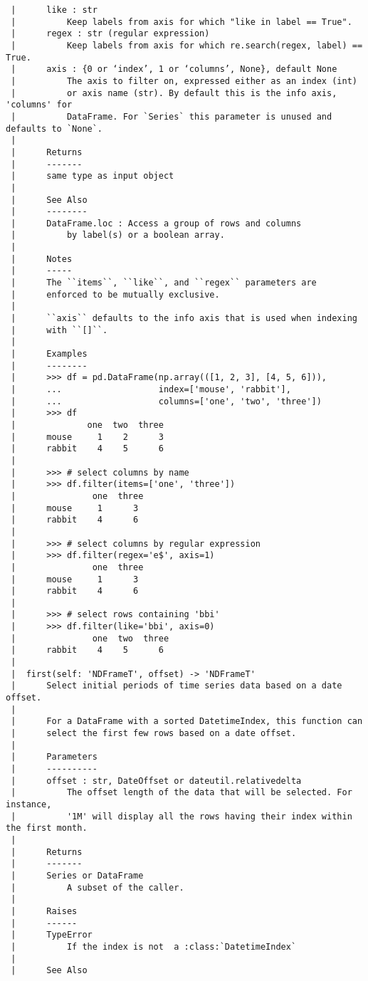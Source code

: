 \documentclass[
  letterpaper,
  DIV=11,
  numbers=noendperiod]{scrreprt}
\begin{document}
\begin{verbatim}
 |      like : str
 |          Keep labels from axis for which "like in label == True".
 |      regex : str (regular expression)
 |          Keep labels from axis for which re.search(regex, label) == True.
 |      axis : {0 or ‘index’, 1 or ‘columns’, None}, default None
 |          The axis to filter on, expressed either as an index (int)
 |          or axis name (str). By default this is the info axis, 'columns' for
 |          DataFrame. For `Series` this parameter is unused and defaults to `None`.
 |      
 |      Returns
 |      -------
 |      same type as input object
 |      
 |      See Also
 |      --------
 |      DataFrame.loc : Access a group of rows and columns
 |          by label(s) or a boolean array.
 |      
 |      Notes
 |      -----
 |      The ``items``, ``like``, and ``regex`` parameters are
 |      enforced to be mutually exclusive.
 |      
 |      ``axis`` defaults to the info axis that is used when indexing
 |      with ``[]``.
 |      
 |      Examples
 |      --------
 |      >>> df = pd.DataFrame(np.array(([1, 2, 3], [4, 5, 6])),
 |      ...                   index=['mouse', 'rabbit'],
 |      ...                   columns=['one', 'two', 'three'])
 |      >>> df
 |              one  two  three
 |      mouse     1    2      3
 |      rabbit    4    5      6
 |      
 |      >>> # select columns by name
 |      >>> df.filter(items=['one', 'three'])
 |               one  three
 |      mouse     1      3
 |      rabbit    4      6
 |      
 |      >>> # select columns by regular expression
 |      >>> df.filter(regex='e$', axis=1)
 |               one  three
 |      mouse     1      3
 |      rabbit    4      6
 |      
 |      >>> # select rows containing 'bbi'
 |      >>> df.filter(like='bbi', axis=0)
 |               one  two  three
 |      rabbit    4    5      6
 |  
 |  first(self: 'NDFrameT', offset) -> 'NDFrameT'
 |      Select initial periods of time series data based on a date offset.
 |      
 |      For a DataFrame with a sorted DatetimeIndex, this function can
 |      select the first few rows based on a date offset.
 |      
 |      Parameters
 |      ----------
 |      offset : str, DateOffset or dateutil.relativedelta
 |          The offset length of the data that will be selected. For instance,
 |          '1M' will display all the rows having their index within the first month.
 |      
 |      Returns
 |      -------
 |      Series or DataFrame
 |          A subset of the caller.
 |      
 |      Raises
 |      ------
 |      TypeError
 |          If the index is not  a :class:`DatetimeIndex`
 |      
 |      See Also

\end{verbatim}
\end{document}
